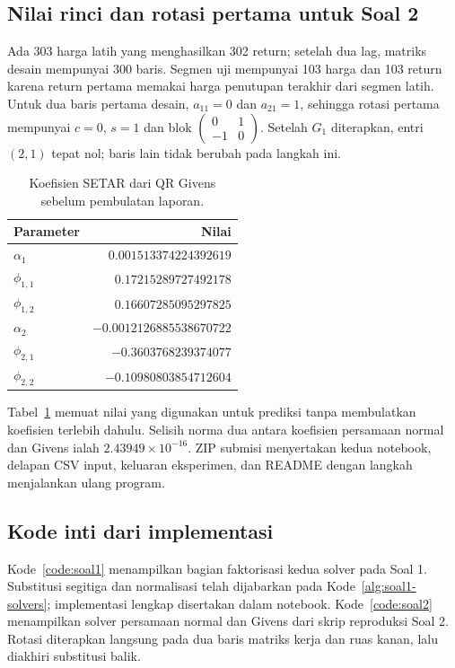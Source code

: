\documentclass[12pt,a4paper]{article}
\numberwithin{equation}{section}
\begin{document}
\subsection{Nilai rinci dan rotasi pertama untuk Soal 2}
Ada 303 harga latih yang menghasilkan 302 return; setelah dua lag, matriks desain mempunyai 300 baris. Segmen uji mempunyai 103 harga dan 103 return karena return pertama memakai harga penutupan terakhir dari segmen latih. Untuk dua baris pertama desain, $a_{11}=0$ dan $a_{21}=1$, sehingga rotasi pertama mempunyai $c=0$, $s=1$ dan blok $\left(\begin{smallmatrix}0&1\\-1&0\end{smallmatrix}\right)$. Setelah $G_1$ diterapkan, entri $(2,1)$ tepat nol; baris lain tidak berubah pada langkah ini.
\begin{table}[H]\centering\small
\caption{Koefisien SETAR dari QR Givens sebelum pembulatan laporan.}\label{tab:appendix-coeff}
\begin{tabular}{lr}\toprule
Parameter & Nilai\\\midrule
$\alpha_1$ & $0.001513374224392619$\\
$\phi_{1,1}$ & $0.17215289727492178$\\
$\phi_{1,2}$ & $0.16607285095297825$\\
$\alpha_2$ & $-0.0012126885538670722$\\
$\phi_{2,1}$ & $-0.3603768239374077$\\
$\phi_{2,2}$ & $-0.10980803854712604$\\\bottomrule
\end{tabular}\end{table}
Tabel~\ref{tab:appendix-coeff} memuat nilai yang digunakan untuk prediksi tanpa membulatkan koefisien terlebih dahulu. Selisih norma dua antara koefisien persamaan normal dan Givens ialah $2.43949\times10^{-16}$. ZIP submisi menyertakan kedua notebook, delapan CSV input, keluaran eksperimen, dan README dengan langkah menjalankan ulang program.
\clearpage
\subsection{Kode inti dari implementasi}
Kode~\ref{code:soal1} menampilkan bagian faktorisasi kedua solver pada Soal 1. Substitusi segitiga dan normalisasi telah dijabarkan pada Kode~\ref{alg:soal1-solvers}; implementasi lengkap disertakan dalam notebook. Kode~\ref{code:soal2} menampilkan solver persamaan normal dan Givens dari skrip reproduksi Soal 2. Rotasi diterapkan langsung pada dua baris matriks kerja dan ruas kanan, lalu diakhiri substitusi balik.

\clearpage

\end{document}
